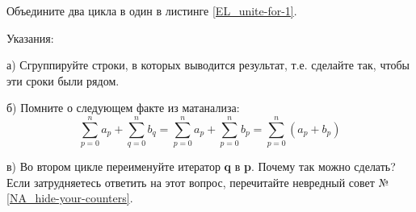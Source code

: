 Объедините два цикла в один в листинге \ref{EL_unite-for-1}.

Указания:

а)
Сгруппируйте строки, в которых выводится результат,
т.е. сделайте так, чтобы эти сроки были рядом.

б)
Помните о следующем факте из матанализа:
$$
	\sum_{p=0}^n a_p + \sum_{q=0}^n b_q =
	\sum_{p=0}^n a_p + \sum_{p=0}^n b_p =
	\sum_{p=0}^n (a_p + b_p)
$$

в)
Во втором цикле переименуйте итератор \textbf{q} в \textbf{p}.
Почему так можно сделать?
Если затрудняетесь ответить на этот вопрос, перечитайте невредный совет №\ref{NA_hide-your-counters}.
